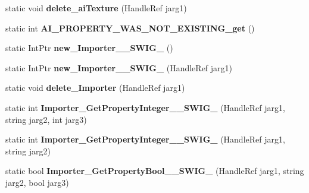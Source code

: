 \begin{DoxyCompactItemize}
\item 
\hypertarget{class_assimp_p_i_n_v_o_k_e_a62bd230581636702d62267b9ea13512f}{static void {\bfseries delete\+\_\+ai\+Texture} (Handle\+Ref jarg1)}\label{class_assimp_p_i_n_v_o_k_e_a62bd230581636702d62267b9ea13512f}

\item 
\hypertarget{class_assimp_p_i_n_v_o_k_e_ae02cd6128561ae8fe4c7d4ad98d8ea6e}{static int {\bfseries A\+I\+\_\+\+P\+R\+O\+P\+E\+R\+T\+Y\+\_\+\+W\+A\+S\+\_\+\+N\+O\+T\+\_\+\+E\+X\+I\+S\+T\+I\+N\+G\+\_\+get} ()}\label{class_assimp_p_i_n_v_o_k_e_ae02cd6128561ae8fe4c7d4ad98d8ea6e}

\item 
\hypertarget{class_assimp_p_i_n_v_o_k_e_adc9004feff96a7cb0a36aad036344945}{static Int\+Ptr {\bfseries new\+\_\+\+Importer\+\_\+\+\_\+\+S\+W\+I\+G\+\_} ()}\label{class_assimp_p_i_n_v_o_k_e_adc9004feff96a7cb0a36aad036344945}

\item 
\hypertarget{class_assimp_p_i_n_v_o_k_e_a96aa3c0a76294cdcdbbd86ca30f2be14}{static Int\+Ptr {\bfseries new\+\_\+\+Importer\+\_\+\+\_\+\+S\+W\+I\+G\+\_} (Handle\+Ref jarg1)}\label{class_assimp_p_i_n_v_o_k_e_a96aa3c0a76294cdcdbbd86ca30f2be14}

\item 
\hypertarget{class_assimp_p_i_n_v_o_k_e_aaba56bf1257fafaf591ea49a5a7a43c4}{static void {\bfseries delete\+\_\+\+Importer} (Handle\+Ref jarg1)}\label{class_assimp_p_i_n_v_o_k_e_aaba56bf1257fafaf591ea49a5a7a43c4}

\item 
\hypertarget{class_assimp_p_i_n_v_o_k_e_a12d291ef0e328956ccddd700546020d4}{static int {\bfseries Importer\+\_\+\+Get\+Property\+Integer\+\_\+\+\_\+\+S\+W\+I\+G\+\_} (Handle\+Ref jarg1, string jarg2, int jarg3)}\label{class_assimp_p_i_n_v_o_k_e_a12d291ef0e328956ccddd700546020d4}

\item 
\hypertarget{class_assimp_p_i_n_v_o_k_e_ad45f6bed4898327ef18ebf17460e15f2}{static int {\bfseries Importer\+\_\+\+Get\+Property\+Integer\+\_\+\+\_\+\+S\+W\+I\+G\+\_} (Handle\+Ref jarg1, string jarg2)}\label{class_assimp_p_i_n_v_o_k_e_ad45f6bed4898327ef18ebf17460e15f2}

\item 
\hypertarget{class_assimp_p_i_n_v_o_k_e_a06d652f9366eb3749bd88bfe160d9530}{static bool {\bfseries Importer\+\_\+\+Get\+Property\+Bool\+\_\+\+\_\+\+S\+W\+I\+G\+\_} (Handle\+Ref jarg1, string jarg2, bool jarg3)}\label{class_assimp_p_i_n_v_o_k_e_a06d652f9366eb3749bd88bfe160d9530}


\end{DoxyCompactItemize}
